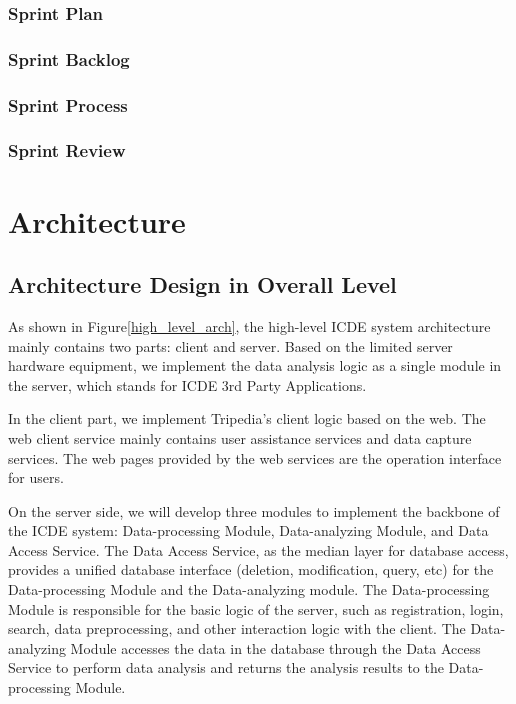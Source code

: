 \documentclass[conference]{IEEEtran}
\begin{document}
\subsubsection{\textbf{Sprint Plan}}



\subsubsection{\textbf{Sprint Backlog}}

\subsubsection{\textbf{Sprint Process}}

\subsubsection{\textbf{Sprint Review}}


\section{\textbf{Architecture}}


\subsection{\textbf{Architecture Design in Overall Level}}

As shown in Figure\ref{high_level_arch}, the high-level ICDE system architecture mainly contains two parts: client and server. Based on the limited server hardware equipment, we implement the data analysis logic as a single module in the server, which stands for ICDE 3rd Party Applications. 

In the client part, we implement Tripedia's client logic based on the web. The web client service mainly contains user assistance services and data capture services. The web pages provided by the web services are the operation interface for users.

On the server side, we will develop three modules to implement the backbone of the ICDE system: Data-processing Module, Data-analyzing Module, and Data Access Service. The Data Access Service, as the median layer for database access, provides a unified database interface (deletion, modification, query, etc) for the Data-processing Module and the Data-analyzing module. The Data-processing Module is responsible for the basic logic of the server, such as registration, login, search, data preprocessing, and other interaction logic with the client. The Data-analyzing Module accesses the data in the database through the Data Access Service to perform data analysis and returns the analysis results to the Data-processing Module.
\end{document}
